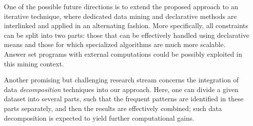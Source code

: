 One of the possible future directions is to extend the proposed approach to an iterative technique, where dedicated data mining and declarative methods are interlinked and applied in an alternating fashion. More specifically, all constraints can be split into two parts: those that can be effectively handled using declarative means and those for which specialized algorithms are much more scalable. Answer set programs with external computations \parencite{hp} could be possibly exploited in this mining context. %


Another promising but challenging research stream concerns the integration of data \emph{decomposition} techniques into our approach. Here, one can divide a given dataset into several parts, such that the frequent patterns are identified in these parts separately, and then the results are effectively combined; such data decomposition is expected to yield further computational gains. 



